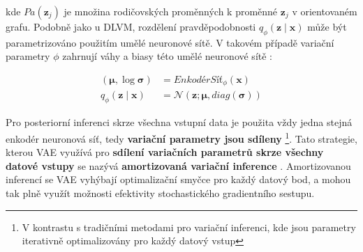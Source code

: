 kde $Pa(\textbf{z}_j)$ je množina rodičovských proměnných k proměnné $\textbf{z}_j$ v orientovaném grafu.
Podobně jako u DLVM, rozdělení pravděpodobnosti $q_\phi(\textbf{z}\mid\textbf{x})$ může být parametrizováno použitím umělé neuronové sítě.
V takovém případě variační parametry $\phi$ zahrnují váhy a biasy této umělé neuronové sítě \cite{Kingma2014}:


\begin{align}
    (\boldsymbol{\mu}, \log \boldsymbol{\sigma}) &= EnkodérSíť_\phi(\textbf{x}) \\
    q_\phi(\textbf{z}\mid\textbf{x}) &= \mathcal{N}(\textbf{z}; \boldsymbol{\mu}, diag(\boldsymbol{\sigma}))
\end{align}

Pro posteriorní inferenci skrze všechna vstupní data je použita vždy jedna stejná enkodér neuronová síť, tedy \textbf{variační parametry jsou sdíleny}
\footnote{V kontrastu s tradičními metodami pro variační inferenci, kde jsou parametry iterativně optimalizovány pro každý datový vstup}.
Tato strategie, kterou VAE využívá pro \textbf{sdílení variačních parametrů skrze všechny datové vstupy} se nazývá \textbf{amortizovaná variační inference} \cite{Gershman2014}.
Amortizovanou inferencí se VAE vyhýbají optimalizační smyčce pro každý datový bod, a mohou tak plně využít možnosti efektivity stochastického gradientního sestupu. \cite{Kingma2019}